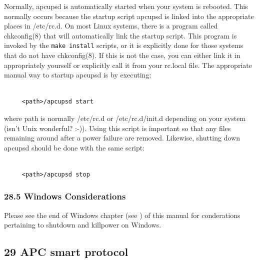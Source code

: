 {{{{{{{{{{{{{{{{{\label{index-Startup-260}
Normally, apcupsd is automatically started when your system is rebooted. This
normally occurs because the startup script apcupsd is linked into the
appropriate places in /etc/rc.d. On most Linux systems, there is a program
called chkconfig(8) that will automatically link the startup script.  This
program is invoked by the {\tt make install} scripts, or it is explicitly done
for those systems that do not have chkconfig(8). If this is not the case, you
can either link it in appropriately yourself or explicitly call it from your
rc.local file. The appropriate manual way to startup apcupsd is by executing: 

\footnotesize
\begin{verbatim}
     
     <path>/apcupsd start
\end{verbatim}
\normalsize

where \lt{}path\gt{} is normally /etc/rc.d or /etc/rc.d/init.d depending on
your system (isn't Unix wonderful? :-)). Using this script is important so
that any files remaining around after a power failure are removed. Likewise,
shutting down apcupsd should be done with the same script: 

\footnotesize
\begin{verbatim}
     
     <path>/apcupsd stop
\end{verbatim}
\normalsize

\label{Windows-Considerations}

\subsubsection*{28.5 Windows Considerations}

\label{index-Windows-Considerations-261}
Please see the end of Windows chapter (see 
) of this
manual for conderations pertaining to shutdown and killpower on Windows. 

\label{APC-smart-protocol}

\subsection*{29 APC smart protocol}

}}}}}}}}}}}}}}}}}
